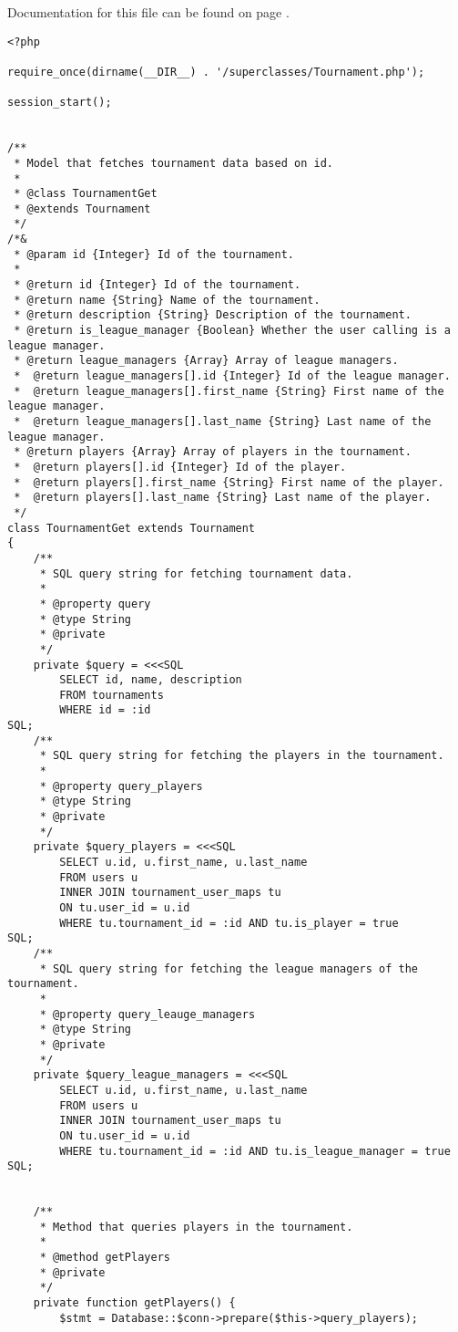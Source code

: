Documentation for this file can be found on page \pageref{TournamentGet.php.doc}.

{\scriptsize
\begin{lstlisting}
<?php

require_once(dirname(__DIR__) . '/superclasses/Tournament.php');

session_start();


/**
 * Model that fetches tournament data based on id.
 *
 * @class TournamentGet
 * @extends Tournament
 */
/*&
 * @param id {Integer} Id of the tournament.
 *
 * @return id {Integer} Id of the tournament.
 * @return name {String} Name of the tournament.
 * @return description {String} Description of the tournament.
 * @return is_league_manager {Boolean} Whether the user calling is a league manager.
 * @return league_managers {Array} Array of league managers.
 *  @return league_managers[].id {Integer} Id of the league manager.
 *  @return league_managers[].first_name {String} First name of the league manager.
 *  @return league_managers[].last_name {String} Last name of the league manager.
 * @return players {Array} Array of players in the tournament.
 *  @return players[].id {Integer} Id of the player.
 *  @return players[].first_name {String} First name of the player.
 *  @return players[].last_name {String} Last name of the player.
 */
class TournamentGet extends Tournament
{
	/**
	 * SQL query string for fetching tournament data.
	 *
	 * @property query
	 * @type String
	 * @private
	 */
	private $query = <<<SQL
		SELECT id, name, description
		FROM tournaments
		WHERE id = :id
SQL;
	/**
	 * SQL query string for fetching the players in the tournament.
	 *
	 * @property query_players
	 * @type String
	 * @private
	 */
	private $query_players = <<<SQL
		SELECT u.id, u.first_name, u.last_name
		FROM users u
		INNER JOIN tournament_user_maps tu
		ON tu.user_id = u.id
		WHERE tu.tournament_id = :id AND tu.is_player = true
SQL;
	/**
	 * SQL query string for fetching the league managers of the tournament.
	 *
	 * @property query_leauge_managers
	 * @type String
	 * @private
	 */
	private $query_league_managers = <<<SQL
		SELECT u.id, u.first_name, u.last_name
		FROM users u
		INNER JOIN tournament_user_maps tu
		ON tu.user_id = u.id
		WHERE tu.tournament_id = :id AND tu.is_league_manager = true
SQL;


	/**
	 * Method that queries players in the tournament.
	 *
	 * @method getPlayers
	 * @private
	 */
	private function getPlayers() {
		$stmt = Database::$conn->prepare($this->query_players);


\end{lstlisting}}
